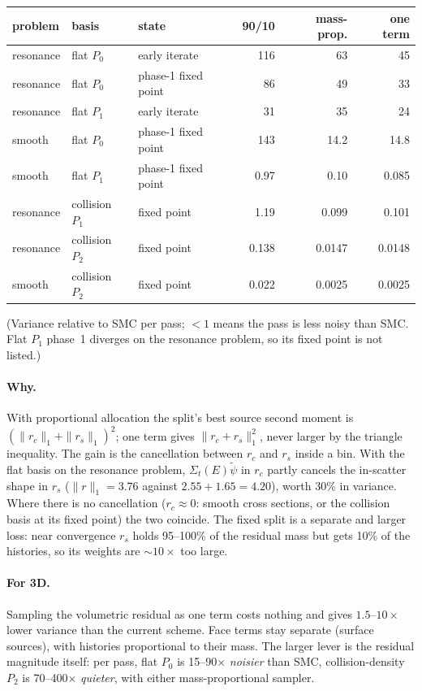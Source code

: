 \documentclass[11pt]{article}
\newcommand{\tpsi}{\tilde\psi}
\newcommand{\Sigt}{\Sigma_t}
\begin{document}
\begin{center}
\begin{tabular}{lll rrr}
\toprule
problem & basis & state & 90/10 & mass-prop. & one term \\
\midrule
resonance & flat $P_0$ & early iterate & 116 & 63 & 45 \\
resonance & flat $P_0$ & phase-1 fixed point & 86 & 49 & 33 \\
resonance & flat $P_1$ & early iterate & 31 & 35 & 24 \\
smooth & flat $P_0$ & phase-1 fixed point & 143 & 14.2 & 14.8 \\
smooth & flat $P_1$ & phase-1 fixed point & 0.97 & 0.10 & 0.085 \\
resonance & collision $P_1$ & fixed point & 1.19 & 0.099 & 0.101 \\
resonance & collision $P_2$ & fixed point & 0.138 & 0.0147 & 0.0148 \\
smooth & collision $P_2$ & fixed point & 0.022 & 0.0025 & 0.0025 \\
\bottomrule
\end{tabular}
\end{center}
\noindent (Variance relative to SMC per pass; $<1$ means the pass is less noisy than SMC.
Flat $P_1$ phase~1 diverges on the resonance problem, so its fixed point is not listed.)

\paragraph{Why.} With proportional allocation the split's best source second moment is
$(\|r_c\|_1+\|r_s\|_1)^2$; one term gives $\|r_c+r_s\|_1^2$, never larger by the triangle
inequality. The gain is the cancellation between $r_c$ and $r_s$ inside a bin. With the
flat basis on the resonance problem, $\Sigt(E)\tpsi$ in $r_c$ partly cancels the in-scatter
shape in $r_s$ ($\|r\|_1=3.76$ against $2.55+1.65=4.20$), worth 30\% in variance. Where
there is no cancellation ($r_c\approx0$: smooth cross sections, or the collision basis at
its fixed point) the two coincide. The fixed split is a separate and larger loss: near
convergence $r_s$ holds 95--100\% of the residual mass but gets 10\% of the histories, so
its weights are $\sim10\times$ too large.

\paragraph{For 3D.} Sampling the volumetric residual as one term costs nothing and gives
$1.5$--$10\times$ lower variance than the current scheme. Face terms stay separate
(surface sources), with histories proportional to their mass. The larger lever is the
residual magnitude itself: per pass, flat $P_0$ is 15--90$\times$ \emph{noisier} than
SMC, collision-density $P_2$ is 70--400$\times$ \emph{quieter}, with either
mass-proportional sampler.
\end{document}
